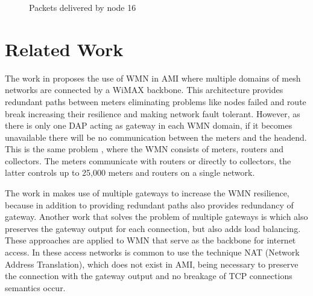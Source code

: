 \documentclass[conference]{IEEEtran}
\begin{document}
\begin{figure}[ht]
{    
  }
  \caption{Packets delivered by node 16}
  \label{n16-dap2}
\end{figure}


\section{Related Work}

The work in \cite{Gungor2006}  proposes the use of WMN in AMI where multiple domains of mesh networks are connected by a WiMAX backbone. This architecture provides redundant paths between meters eliminating problems like nodes failed and route break increasing their resilience and making network fault tolerant. However, as there is only one DAP acting as gateway in each WMN domain, if it becomes unavailable there will be no communication between the meters and the headend. This is the same problem \cite{Silva2010}, where the WMN consists of meters, routers and collectors. The meters communicate with routers or directly to collectors, the latter controls up to 25,000 meters and routers on a single network.

The work in \cite{Silva2010} makes use of multiple gateways to increase the WMN resilience, because in addition to providing redundant paths also provides redundancy of gateway. Another work that solves the problem of multiple gateways is \cite{ClaytonR.daSilva2011}  which also preserves the gateway output for each connection, but also adds load balancing. These approaches are applied to WMN that serve as the backbone for internet access. In these access networks is common to use the technique NAT (Network Address Translation), which does not exist in AMI, being necessary to preserve the connection with the gateway output and no breakage of TCP connections semantics occur.
\end{document}
